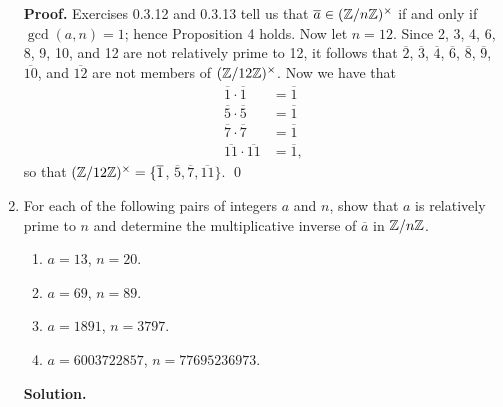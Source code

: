 \begin{enumerate}
      \textbf{Proof.} Exercises 0.3.12 and 0.3.13 tell us that
      $\overline{a} \in (\mathbb{Z}/n\mathbb{Z})^\times$ if and only if $\gcd(a, n) = 1$; hence
      Proposition 4 holds. Now let $n = 12$. Since 2, 3, 4, 6, 8, 9, 10, and
      12 are not relatively prime to 12, it follows that $\overline{2}$,
      $\overline{3}$, $\overline{4}$, $\overline{6}$, $\overline{8}$,
      $\overline{9}$, $\overline{10}$, and $\overline{12}$ are not members of
      $(\mathbb{Z}/12\mathbb{Z})^\times$. Now we have that
      \begin{align*}
         \overline{1} \cdot \overline{1} &= \overline{1} \\
         \overline{5} \cdot \overline{5} &= \overline{1} \\
         \overline{7} \cdot \overline{7} &= \overline{1} \\
         \overline{11} \cdot \overline{11} &= \overline{1},
      \end{align*}
      so that $(\mathbb{Z}/12\mathbb{Z})^\times = \{\overline{1}$, $\overline{5},
      \overline{7}, \overline{11}\}$. \qed
   \item[0.3.15]  For each of the following pairs of integers $a$ and $n$, show
                  that $a$ is relatively prime to $n$ and determine the
                  multiplicative inverse of $\overline{a}$ in $\mathbb{Z}/n\mathbb{Z}$.
                  \begin{enumerate}
                     \item $a = 13$, $n = 20$.
                     \item $a = 69$, $n = 89$.
                     \item $a = 1891$, $n = 3797$.
                     \item $a = 6003722857$, $n = 77695236973$.
                  \end{enumerate}

      \textbf{Solution.}


\end{enumerate}
